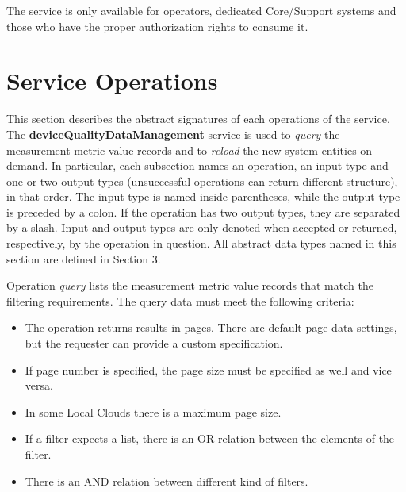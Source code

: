 \documentclass[a4paper]{arrowhead}
\begin{document}
The service is only available for operators, dedicated Core/Support systems and those who have the proper authorization rights to consume it.

\newpage

\section{Service Operations}
\label{sec:functions}

This section describes the abstract signatures of each operations of the service. The \textbf{deviceQualityDataManagement} service is used to \textit{query} the measurement metric value records and to \textit{reload} the new system entities on demand.
In particular, each subsection names an operation, an input type and one or two output types (unsuccessful operations can return different structure), in that order.
The input type is named inside parentheses, while the output type is preceded by a colon. If the operation has two output types, they are separated by a slash.
Input and output types are only denoted when accepted or returned, respectively, by the operation in question. All abstract data types named in this section are defined in Section 3.



Operation \textit{query} lists the measurement metric value records that match the filtering requirements. The query data must meet the following criteria:

\begin{itemize}
    \item The operation returns results in pages. There are default page data settings, but the requester can provide a custom specification.
    \item If page number is specified, the page size must be specified as well and vice versa.
    \item In some Local Clouds there is a maximum page size.
    \item If a filter expects a list, there is an OR relation between the elements of the filter.
    \item There is an AND relation between different kind of filters.
\end{itemize}

\end{document}
